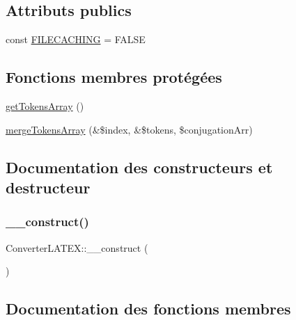 \subsection*{Attributs publics}
\begin{DoxyCompactItemize}
\item 
const \hyperlink{class_converter_l_a_t_e_x_adaea9c0bff492f67f17ebe245ee889b1}{F\+I\+L\+E\+C\+A\+C\+H\+I\+NG} = F\+A\+L\+SE
\end{DoxyCompactItemize}
\subsection*{Fonctions membres protégées}
\begin{DoxyCompactItemize}
\item 
\hyperlink{class_converter_l_a_t_e_x_a99d0b931aa33c2e4282c28f03b248e85}{get\+Tokens\+Array} ()
\item 
\hyperlink{class_converter_l_a_t_e_x_a5c2a6e5f6478af9a846f3b607c8d9105}{merge\+Tokens\+Array} (\&\$index, \&\$tokens, \$conjugation\+Arr)
\end{DoxyCompactItemize}


\subsection{Documentation des constructeurs et destructeur}
\hypertarget{class_converter_l_a_t_e_x_a9f95639d71711394c59d0afd7b516d89}{}\label{class_converter_l_a_t_e_x_a9f95639d71711394c59d0afd7b516d89} 
\subsubsection{\texorpdfstring{\+\_\+\+\_\+construct()}{\_\_construct()}}
{\footnotesize\ttfamily Converter\+L\+A\+T\+E\+X\+::\+\_\+\+\_\+construct (\begin{DoxyParamCaption}{ }\end{DoxyParamCaption})}



\subsection{Documentation des fonctions membres}
\hypertarget{class_converter_l_a_t_e_x_a1a30f6b145b4cb051d9dbbf8f9e8978f}{}\label{class_converter_l_a_t_e_x_a1a30f6b145b4cb051d9dbbf8f9e8978f} 
